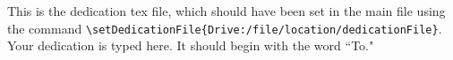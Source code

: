 This is the dedication tex file, which should have been set in the main file using the command \verb|\setDedicationFile{Drive:/file/location/dedicationFile}|. Your dedication is typed here. It should begin with the word “To."